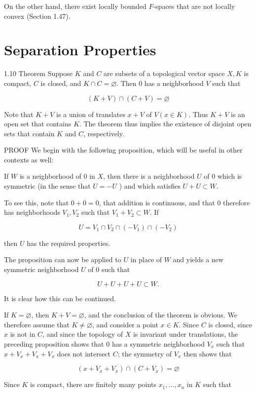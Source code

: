 \documentclass[10pt]{article}
\begin{document}
On the other hand, there exist locally bounded $F$-spaces that are not locally convex (Section 1.47).

\section{Separation Properties}
1.10 Theorem Suppose $K$ and $C$ are subsets of a topological vector space $X, K$ is compact, $C$ is closed, and $K \cap C=\varnothing$. Then 0 has a neighborhood $V$ such that

$$
(K+V) \cap(C+V)=\varnothing
$$

Note that $K+V$ is a union of translates $x+V$ of $V(x \in K)$. Thus $K+V$ is an open set that contains $K$. The theorem thus implies the existence of disjoint open sets that contain $K$ and $C$, respectively.

PROOF We begin with the following proposition, which will be useful in other contexts as well:

If $W$ is a neighborhood of 0 in $X$, then there is a neighborhood $U$ of 0 which is symmetric (in the sense that $U=-U$ ) and which satisfies $U+U \subset W$.

To see this, note that $0+0=0$, that addition is continuous, and that 0 therefore has neighborhoods $V_{1}, V_{2}$ such that $V_{1}+V_{2} \subset W$. If

$$
U=V_{1} \cap V_{2} \cap\left(-V_{1}\right) \cap\left(-V_{2}\right)
$$

then $U$ has the required properties.

The proposition can now be applied to $U$ in place of $W$ and yields a new symmetric neighborhood $U$ of 0 such that

$$
U+U+U+U \subset W .
$$

It is clear how this can be continued.

If $K=\varnothing$, then $K+V=\varnothing$, and the conclusion of the theorem is obvious. We therefore assume that $K \neq \varnothing$, and consider a point $x \in K$. Since $C$ is closed, since $x$ is not in $C$, and since the topology of $X$ is invariant under translations, the preceding proposition shows that 0 has a symmetric neighborhood $V_{x}$ such that $x+V_{x}+V_{x}+V_{x}$ does not intersect $C$; the symmetry of $V_{x}$ then shows that

$$
\left(x+V_{x}+V_{x}\right) \cap\left(C+V_{x}\right)=\varnothing
$$

Since $K$ is compact, there are finitely many points $x_{1}, \ldots, x_{n}$ in $K$ such that
\end{document}
